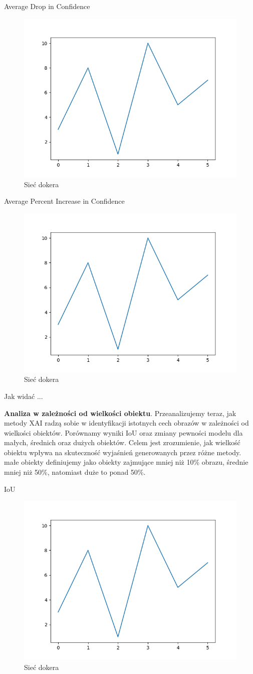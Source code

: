 Average Drop in Confidence
\begin{figure}
  \centering\includegraphics[width=.6\textwidth]{images/example}
\caption{Sieć dokera \cite{docker_compose_reference}}  \label{rys:network}
\end{figure}

Average Percent Increase in Confidence
\begin{figure}
  \centering\includegraphics[width=.6\textwidth]{images/example}
\caption{Sieć dokera \cite{docker_compose_reference}}  \label{rys:network}
\end{figure}

Jak widać ...

\textbf{Analiza w zależności od wielkości obiektu}.
Przeanalizujemy teraz, jak metody XAI radzą sobie w identyfikacji istotnych cech obrazów w zależności od wielkości obiektów.
Porównamy wyniki IoU oraz zmiany pewności modelu dla małych, średnich oraz dużych obiektów.
Celem jest zrozumienie, jak wielkość obiektu wpływa na skuteczność wyjaśnień generowanych przez różne metody.
małe obiekty definiujemy jako obiekty zajmujące mniej niż 10\% obrazu, średnie mniej niż 50\%, natomiast duże to ponad 50\%.

IoU
\begin{figure}
  \centering\includegraphics[width=.6\textwidth]{images/example}
\caption{Sieć dokera \cite{docker_compose_reference}}  \label{rys:network}
\end{figure}

